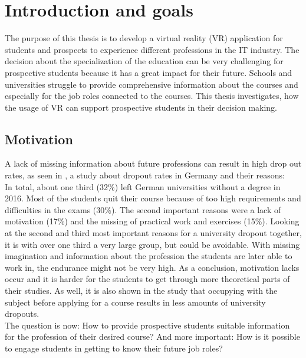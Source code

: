 \chapter{Introduction and goals}
The purpose of this thesis is to develop a virtual reality (VR) application for students and prospects to experience different professions in the IT industry. 
The decision about the specialization of the education can be very challenging for prospective students because it has a great impact for their future. Schools and universities struggle to provide comprehensive information about the courses and especially for the job roles connected to the courses. This thesis investigates, how the usage of VR can support prospective students in their decision making.






\section{Motivation}
A lack of missing information about future professions can result in high drop out rates, as seen in \cite{UlrichHeublein.Juni2017}, a study about dropout rates in Germany and their reasons: \\ In total, about one third (32\%) left German universities without a degree in 2016. Most of the students quit their course because of too high requirements and difficulties in the exams (30\%). The second important reasons were a lack of motivation (17\%) and the missing of practical work and exercises (15\%).
Looking at the second and third most important reasons for a university dropout together, it is with over one third a very large group, but could be avoidable. With missing imagination and information about the profession the students are later able to work in, the endurance might not be very high. As a conclusion, motivation lacks occur and it is harder for the students to get through more theoretical parts of their studies. As well, it is also shown in the study that occupying with the subject before applying for a course results in less amounts of university dropouts. \\
The question is now: How to provide prospective students suitable information for the profession of their desired course? And more important: How is it possible to engage students in getting to know their future job roles?
